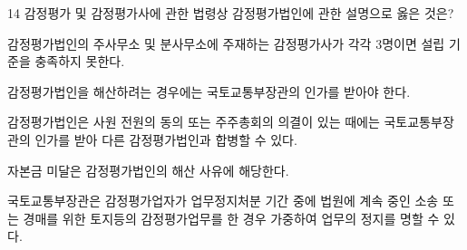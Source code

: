 \begin{question}{14}
감정평가 및 감정평가사에 관한 법령상 감정평가법인에 관한 설명으로 옳은 것은?
\begin{choices}
  \item 감정평가법인의 주사무소 및 분사무소에 주재하는 감정평가사가 각각 3명이면 설립 기준을 충족하지 못한다.
  \item 감정평가법인을 해산하려는 경우에는 국토교통부장관의 인가를 받아야 한다.
  \item 감정평가법인은 사원 전원의 동의 또는 주주총회의 의결이 있는 때에는 국토교통부장관의 인가를 받아 다른 감정평가법인과 합병할 수 있다.
  \item 자본금 미달은 감정평가법인의 해산 사유에 해당한다.
  \item 국토교통부장관은 감정평가업자가 업무정지처분 기간 중에 법원에 계속 중인 소송 또는 경매를 위한 토지등의 감정평가업무를 한 경우 가중하여 업무의 정지를 명할 수 있다.
\end{choices}
\end{question}
